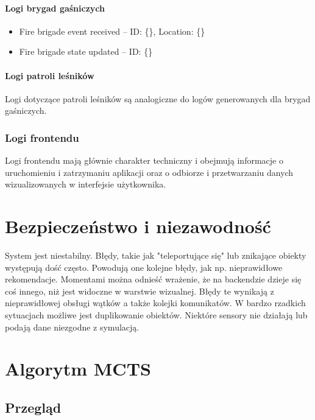 \documentclass[11pt,a4paper]{article}
\begin{document}
\paragraph{Logi brygad gaśniczych}

\begin{itemize}
    \item Fire brigade event received -- ID: \{\}, Location: \{\}
    \item Fire brigade state updated -- ID: \{\}
\end{itemize}

\paragraph{Logi patroli leśników}

Logi dotyczące patroli leśników są analogiczne do logów generowanych dla brygad gaśniczych.

\subsubsection{Logi frontendu}

Logi frontendu mają głównie charakter techniczny i obejmują informacje o uruchomieniu i zatrzymaniu aplikacji oraz o odbiorze i przetwarzaniu danych wizualizowanych w interfejsie użytkownika.

\section{Bezpieczeństwo i niezawodność }
System jest niestabilny. Błędy, takie jak "teleportujące się" lub znikające obiekty występują dość często. Powodują one kolejne błędy, jak np. nieprawidłowe rekomendacje. Momentami można odnieść wrażenie, że na backendzie dzieje się coś innego, niż jest widoczne w warstwie wizualnej. Błędy te wynikają z nieprawidłowej obsługi wątków a także kolejki komunikatów. W bardzo rzadkich sytuacjach możliwe jest duplikowanie obiektów. Niektóre sensory nie działają lub podają dane niezgodne z symulacją. 

\section{Algorytm MCTS}

\subsection{Przegląd}
\end{document}
